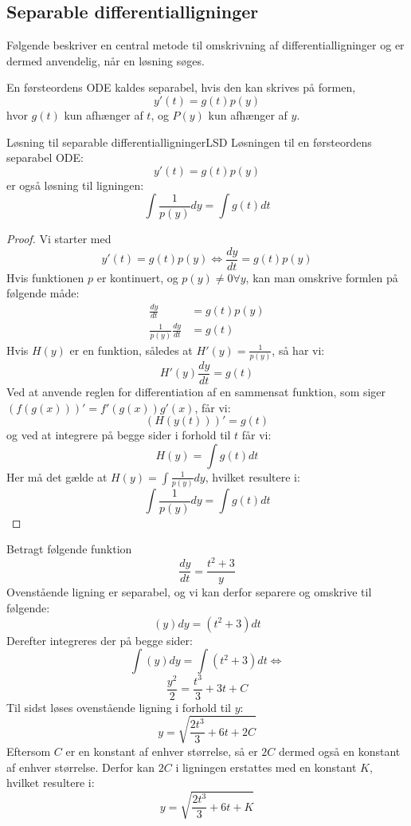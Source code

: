 \subsection{Separable differentialligninger}
Følgende beskriver en central metode til omskrivning af differentialligninger og er dermed anvendelig, når en løsning søges.
\begin{definition}
En førsteordens ODE kaldes separabel, hvis den kan skrives på formen, $$y'(t)=g(t)p(y)$$ hvor $g(t)$ kun afhænger af $t$, og $P(y)$ kun afhænger af $y$.
\end{definition}

\begin{mytheo}{Løsning til separable differentialligninger}{LSD}
Løsningen til en førsteordens separabel ODE:
$$y'(t)=g(t)p(y)$$
er også løsning til ligningen: 
$$\int \frac{1}{p(y)}dy=\int g(t)dt$$
\end{mytheo}

\begin{proof}\hfill \break
Vi starter med $$y'(t)=g(t)p(y)\Longleftrightarrow \frac{dy}{dt} = g(t)p(y)$$
Hvis funktionen $p$ er kontinuert, og $p(y)\neq 0 \forall y$, kan man omskrive formlen på følgende måde:
\begin{align*}
    \frac{dy}{dt} &= g(t)p(y)\\
    \frac{1}{p(y)}\frac{dy}{dt} &= g(t)
\end{align*}
Hvis $H(y)$ er en funktion, således at $H'(y)=\frac{1}{p(y)}$, så har vi: $$H'(y) \frac{dy}{dt}=g(t)$$
Ved at anvende reglen for differentiation af en sammensat funktion, som siger $(f(g(x)))'=f'(g(x))g'(x)$, får vi:
$$(H(y(t)))'=g(t)$$
og ved at integrere på begge sider i forhold til $t$ får vi:
$$H(y)=\int g(t) dt$$
Her må det gælde at $H(y)=\int \frac{1}{p(y)}dy$, hvilket resultere i: $$\int \frac{1}{p(y)}dy=\int g(t) dt$$
\end{proof}

\begin{Example}\hfill \break
\textnormal{Betragt følgende funktion} $$\frac{dy}{dt}=\frac{t^2+3}{y}$$ \textnormal{Ovenstående ligning er separabel, og vi kan derfor separere og omskrive til følgende:} $$(y)dy=(t^2+3)dt$$ \textnormal{Derefter integreres der på begge sider:} $$\int (y)dy=\int (t^2+3)dt\Leftrightarrow$$ $$\frac{y^2}{2}=\frac{t^3}{3}+3t+C$$ \textnormal{Til sidst løses ovenstående ligning i forhold til} $y$:$$y=\sqrt{\frac{2t^3}{3}+6t+2C}$$ \textnormal{Eftersom $C$ er en konstant af enhver størrelse, så er $2C$ dermed også en konstant af enhver størrelse. Derfor kan $2C$ i ligningen erstattes med en konstant $K$, hvilket resultere i:} $$y=\sqrt{\frac{2t^3}{3}+6t+K}$$
\end{Example}


